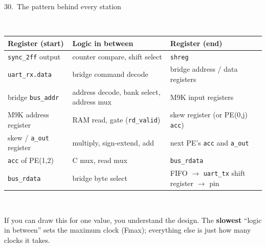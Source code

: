 \documentclass[aspectratio=169,11pt]{beamer}
\newcommand{\sig}[1]{\texttt{#1}}
\begin{document}
\begin{frame}{30.\ The pattern behind every station}
  \centering
  \\[2mm]
  \footnotesize
  \begin{tabular}{@{}lll@{}}
    \toprule
    \textbf{Register (start)} & \textbf{Logic in between} & \textbf{Register (end)} \\
    \midrule
    \sig{sync\_2ff} output & counter compare, shift select & \sig{shreg} \\
    \sig{uart\_rx.data} & bridge command decode & bridge address / data registers \\
    bridge \sig{bus\_addr} & address decode, bank select, address mux & M9K input registers \\
    M9K address register & RAM read, gate (\sig{rd\_valid}) & skew register (or PE(0,j) \sig{acc}) \\
    skew / \sig{a\_out} register & multiply, sign-extend, add & next PE's \sig{acc} and \sig{a\_out} \\
    \sig{acc} of PE(1,2) & C mux, read mux & \sig{bus\_rdata} \\
    \sig{bus\_rdata} & bridge byte select & FIFO $\rightarrow$ \sig{uart\_tx} shift register $\rightarrow$ pin \\
    \bottomrule
  \end{tabular}\\[2mm]
  \raggedright\small
  If you can draw this for one value, you understand the design. The \textbf{slowest} ``logic in between'' sets the
  maximum clock (Fmax); everything else is just how many clocks it takes.
\end{frame}

\end{document}
